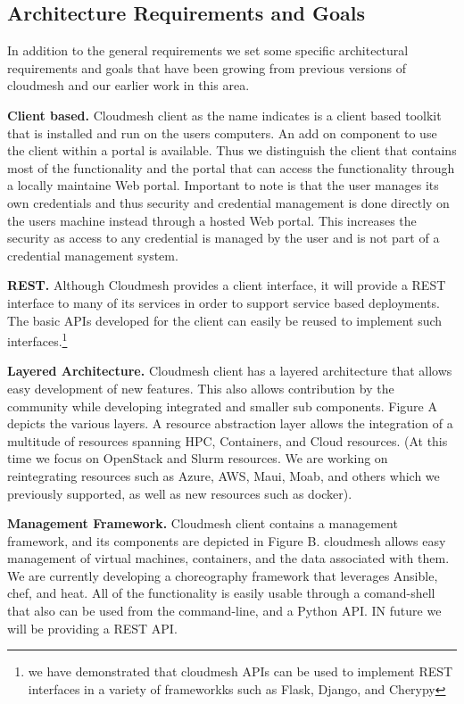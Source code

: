 \documentclass[9pt,twocolumn,twoside]{../../styles/osajnl}
\begin{document}
\subsection{Architecture Requirements and Goals}

In addition to the general requirements we set some specific
architectural requirements and goals that have been growing from
previous versions of cloudmesh and our earlier work in this area.

\begin{description}

\item{\bf Client based.} Cloudmesh client as the name indicates is a
  client based toolkit that is installed and run on the users
  computers. An add on component to use the client within a portal is
  available. Thus we distinguish the client that contains most of the
  functionality and the portal that can access the functionality
  through a locally maintaine Web portal. Important to note is that
  the user manages its own credentials and thus security and
  credential management is done directly on the users machine instead
  through a hosted Web portal. This increases the security as access
  to any credential is managed by the user and is not part of a
  credential management system.

\item{\bf REST.} Although Cloudmesh provides a client interface, it
will provide a REST interface to many of its services in order to
support service based deployments. The basic APIs developed for the
client can easily be reused to implement such interfaces.\footnote{we
  have demonstrated that cloudmesh APIs can be used to implement REST
  interfaces in a variety of frameworkks such as Flask, Django, and Cherypy}

\item{\bf Layered Architecture.} Cloudmesh client has a layered
architecture that allows easy development of new features. This also
allows contribution by the community while developing integrated and
smaller sub components. Figure A depicts the various layers. A
resource abstraction layer allows the integration of a multitude of
resources spanning HPC, Containers, and Cloud resources. (At this time
we focus on OpenStack and Slurm resources. We are working on
reintegrating resources such as Azure, AWS, Maui, Moab, and others
which we previously supported, as well as new resources such as
docker).

\item{\bf Management Framework.} Cloudmesh client contains a
management framework, and its components are depicted in Figure
B. cloudmesh allows easy management of virtual machines, containers,
and the data associated with them. We are currently developing a
choreography framework that leverages Ansible, chef, and heat. All of
the functionality is easily usable through a comand-shell that also
can be used from the command-line, and a Python API. IN future we will
be providing a REST API.


\end{description}
\end{document}
